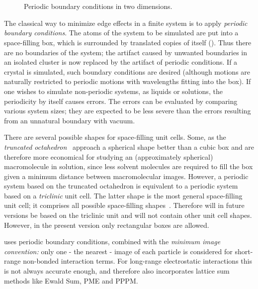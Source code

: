 \section{}
\label{sec:pbc}
\begin{figure}
\centerline{}
\caption {Periodic boundary conditions in two dimensions.}
\label{fig:pbc}
\end{figure}
The classical way to minimize edge effects in a finite system is to
apply {\em periodic boundary conditions}. The atoms of the system to be simulated are put into a space-filling box, which is
surrounded by translated copies of itself (). 
Thus there are no
boundaries of the system; the artifact caused by unwanted
boundaries in an isolated cluster is now replaced by the artifact of
periodic conditions. If a crystal is simulated, such boundary conditions
are desired (although motions are naturally restricted to periodic
motions with wavelengths fitting into the box). If one wishes to
simulate  non-periodic systems, as liquids or solutions, the
periodicity by  itself causes errors. The errors can be evaluated by
comparing various system sizes; they are expected to be less severe than
the errors resulting from an unnatural boundary with vacuum.

There are several possible shapes for space-filling unit cells. Some,
as the {\em truncated octahedron}~\cite{Adams79} approach a spherical
shape better than a cubic box and are therefore more economical for
studying an (approximately spherical) macromolecule in solution, since
less solvent molecules are required to fill the box given a minimum
distance between macromolecular images. However, a periodic system
based on the truncated octahedron is equivalent to a periodic system
based on a {\em triclinic} unit cell. The latter shape is the most
general space-filling unit cell; it comprises all possible
space-filling shapes~\cite{Bekker95}. Therefore {\gromacs} will in
future versions be based on the triclinic unit and will not contain
other unit cell shapes. However, in the present version
only rectangular boxes are allowed.
  
{\gromacs} uses periodic boundary conditions, combined with the {\em
minimum image convention:} only one - the nearest - image of each
particle is considered for short-range non-bonded interaction terms.
For long-range electrostatic interactions this is not always accurate
enough, and {\gromacs} therefore also incorporates lattice sum methods
like Ewald Sum, PME and PPPM.

